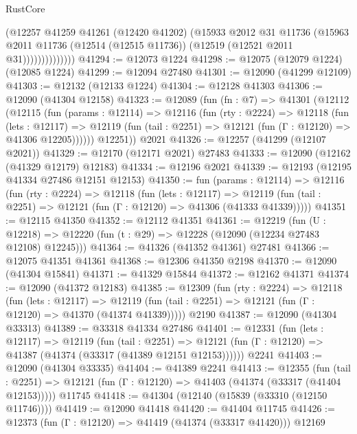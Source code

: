 \begin{lexlean}{RustCore}
\begin{coremodule}
                      (@12257
                        @41259
                        @41261
                        (@12420 @41202)
                        (@15933
                          @2012
                          @31
                          @11736
                          (@15963
                            @2011
                            @11736
                            (@12514 (@12515 @11736))
                            (@12519 (@12521 @2011 @31))))))))))))))
@41294 := @12073 @1224
@41298 := @12075 (@12079 @1224) (@12085 @1224)
@41299 := @12094 @27480
@41301 := @12090 (@41299 @12109)
@41303 := @12132 (@12133 @1224)
@41304 := @12128 @41303
@41306 := @12090 (@41304 @12158)
@41323 := @12089
    (fun (fn : @7) =>
    @41301
      (@12112
        (@12115
          (fun (params : @12114) =>
          @12116
            (fun (rty : @2224) =>
            @12118
              (fun (lets : @12117) =>
              @12119 (fun (tail : @2251) => @12121 (fun (Γ : @12120) => @41306 @12205))))))
        @12251))
    @2021
@41326 := @12257 (@41299 (@12107 @2021))
@41329 := @12170 (@12171 @2021) @27483
@41333 := @12090 (@12162 (@41329 @12179) @12183)
@41334 := @12196 @2021
@41339 := @12193 (@12195 @41334 @27486 @12151 @12153)
@41350 := fun (params : @12114) =>
  @12116
    (fun (rty : @2224) =>
    @12118
      (fun (lets : @12117) =>
      @12119 (fun (tail : @2251) => @12121 (fun (Γ : @12120) => @41306 (@41333 @41339)))))
@41351 := @12115 @41350
@41352 := @12112 @41351
@41361 := @12219
    (fun (U : @12218) => @12220 (fun (t : @29) => @12228 (@12090 (@12234 @27483 @12108) @12245)))
@41364 := @41326 (@41352 @41361) @27481
@41366 := @12075 @41351 @41361
@41368 := @12306 @41350 @2198
@41370 := @12090 (@41304 @15841)
@41371 := @41329 @15844
@41372 := @12162 @41371
@41374 := @12090 (@41372 @12183)
@41385 := @12309
    (fun (rty : @2224) =>
    @12118
      (fun (lets : @12117) =>
      @12119 (fun (tail : @2251) => @12121 (fun (Γ : @12120) => @41370 (@41374 @41339)))))
    @2190
@41387 := @12090 (@41304 @33313)
@41389 := @33318 @41334 @27486
@41401 := @12331
    (fun (lets : @12117) =>
    @12119
      (fun (tail : @2251) =>
      @12121 (fun (Γ : @12120) => @41387 (@41374 (@33317 (@41389 @12151 @12153))))))
    @2241
@41403 := @12090 (@41304 @33335)
@41404 := @41389 @2241
@41413 := @12355
    (fun (tail : @2251) => @12121 (fun (Γ : @12120) => @41403 (@41374 (@33317 (@41404 @12153)))))
    @11745
@41418 := @41304 (@12140 (@15839 (@33310 (@12150 @11746))))
@41419 := @12090 @41418
@41420 := @41404 @11745
@41426 := @12373 (fun (Γ : @12120) => @41419 (@41374 (@33317 @41420))) @12169

\end{coremodule}
\end{lexlean}
